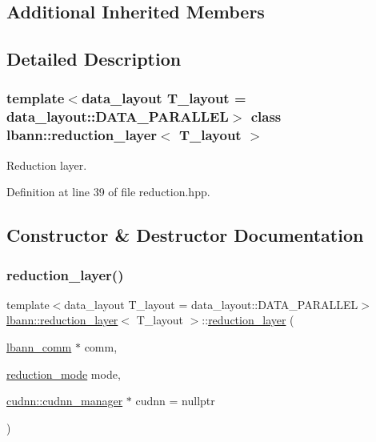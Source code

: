\subsection*{Additional Inherited Members}


\subsection{Detailed Description}
\subsubsection*{template$<$data\+\_\+layout T\+\_\+layout = data\+\_\+layout\+::\+D\+A\+T\+A\+\_\+\+P\+A\+R\+A\+L\+L\+EL$>$\newline
class lbann\+::reduction\+\_\+layer$<$ T\+\_\+layout $>$}

Reduction layer. 

Definition at line 39 of file reduction.\+hpp.



\subsection{Constructor \& Destructor Documentation}
\mbox{\label{classlbann_1_1reduction__layer_ac6e8498f03708ce51e389116107bf135}} 
\subsubsection{\texorpdfstring{reduction\+\_\+layer()}{reduction\_layer()}}
{\footnotesize\ttfamily template$<$data\+\_\+layout T\+\_\+layout = data\+\_\+layout\+::\+D\+A\+T\+A\+\_\+\+P\+A\+R\+A\+L\+L\+EL$>$ \\
\hyperlink{classlbann_1_1reduction__layer}{lbann\+::reduction\+\_\+layer}$<$ T\+\_\+layout $>$\+::\hyperlink{classlbann_1_1reduction__layer}{reduction\+\_\+layer} (\begin{DoxyParamCaption}\item[{\hyperlink{classlbann_1_1lbann__comm}{lbann\+\_\+comm} $\ast$}]{comm,  }\item[{\hyperlink{namespacelbann_a5975e1fb530a267728bfb01dc5c1be9b}{reduction\+\_\+mode}}]{mode,  }\item[{\hyperlink{classlbann_1_1cudnn_1_1cudnn__manager}{cudnn\+::cudnn\+\_\+manager} $\ast$}]{cudnn = {\ttfamily nullptr} }\end{DoxyParamCaption})\hspace{0.3cm}{\ttfamily [inline]}}



